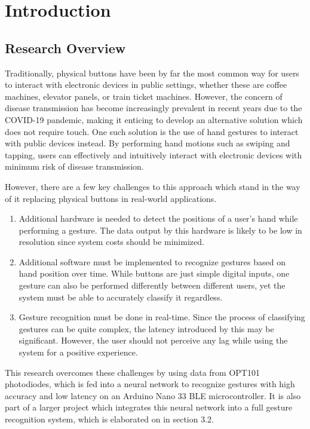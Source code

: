 \setlength{\parskip}{\baselineskip}%
\setlength{\parindent}{0pt}%

\section{Introduction}\label{sec:introduction}
\subsection{Research Overview}\label{subsec:research-overview}
Traditionally, physical buttons have been by far the most common way for users to interact with electronic devices in public settings, whether these are coffee machines, elevator panels, or train ticket machines.
However, the concern of disease transmission has become increasingly prevalent in recent years due to the COVID-19 pandemic, making it enticing to develop an alternative solution which does not require touch.
One such solution is the use of hand gestures to interact with public devices instead.
By performing hand motions such as swiping and tapping, users can effectively and intuitively interact with electronic devices with minimum risk of disease transmission.

However, there are a few key challenges to this approach which stand in the way of it replacing physical buttons in real-world applications.
\begin{enumerate}
    \item Additional hardware is needed to detect the positions of a user's hand while performing a gesture.
    The data output by this hardware is likely to be low in resolution since system costs should be minimized.
    \item Additional software must be implemented to recognize gestures based on hand position over time.
    While buttons are just simple digital inputs, one gesture can also be performed differently between different users, yet the system must be able to accurately classify it regardless.
    \item Gesture recognition must be done in real-time.
    Since the process of classifying gestures can be quite complex, the latency introduced by this may be significant.
    However, the user should not perceive any lag while using the system for a positive experience.
\end{enumerate}

This research overcomes these challenges by using data from OPT101 photodiodes, which is fed into a neural network to recognize gestures with high accuracy and low latency on an Arduino Nano 33 BLE microcontroller.
It is also part of a larger project which integrates this neural network into a full gesture recognition system, which is elaborated on in section 3.2.

